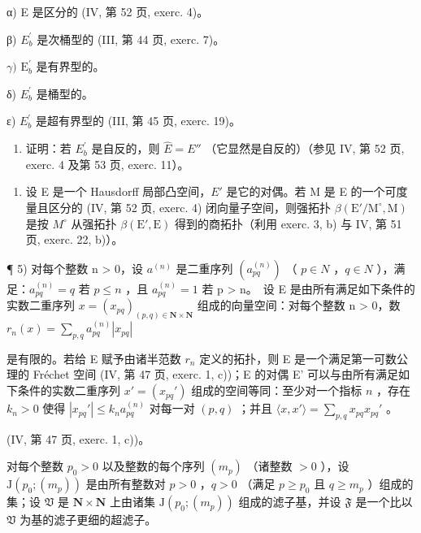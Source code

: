 α) E 是区分的 (IV, 第 52 页, exerc. 4)。

β) \(E_{b}^{\prime}\) 是次桶型的 (III, 第 44 页, exerc. 7)。

\(\gamma)\) \(\mathrm{E}_b^{\prime}\) 是有界型的。

δ) \(E_{b}^{\prime}\) 是桶型的。

ε) \(E_{b}^{\prime}\) 是超有界型的 (III, 第 45 页, exerc. 19)。

\begin{enumerate}
\def\labelenumi{\alph{enumi})}
\setcounter{enumi}{2}
\tightlist
\item
  证明：若 \(E_{b}^{\prime}\) 是自反的，则 \(\hat{E} = E''\) （它显然是自反的）（参见 IV, 第 52 页, exerc. 4 及第 53 页, exerc. 11）。
\end{enumerate}

\begin{enumerate}
\def\labelenumi{\arabic{enumi})}
\setcounter{enumi}{3}
\tightlist
\item
  设 E 是一个 Hausdorff 局部凸空间，\(E'\) 是它的对偶。若 M 是 E 的一个可度量且区分的 (IV, 第 52 页, exerc. 4) 闭向量子空间，则强拓扑 \(\beta(\mathrm{E}'/\mathrm{M}^{\circ}, \mathrm{M})\) 是按 \(M^{\circ}\) 从强拓扑 \(\beta(\mathrm{E}', \mathrm{E})\) 得到的商拓扑（利用 exerc. 3, b) 与 IV, 第 51 页, exerc. 22, b)）。
\end{enumerate}

¶ 5) 对每个整数 n \textgreater{} 0，设 \(a^{(n)}\) 是二重序列 \((a_{pq}^{(n)})\) （ \(p \in N\) ，\(q \in N\) ），满足：\(a_{pq}^{(n)} = q\) 若 \(p \leqslant n\) ，且 \(a_{pq}^{(n)} = 1\) 若 p \textgreater{} n。~设 E 是由所有满足如下条件的实数二重序列 \(x = (x_{pq})_{(p,q) \in \mathbf{N} \times \mathbf{N}}\) 组成的向量空间：对每个整数 n \textgreater{} 0，数 \(r_n(x) = \sum_{p,q} a_{pq}^{(n)} |x_{pq}|\)

是有限的。若给 E 赋予由诸半范数 \(r_n\) 定义的拓扑，则 E 是一个满足第一可数公理的 Fréchet 空间 (IV, 第 47 页, exerc. 1, c))；E 的对偶 E' 可以与由所有满足如下条件的实数二重序列 \(x' = (x_{pq}')\) 组成的空间等同：至少对一个指标 \(n\) ，存在 \(k_n > 0\) 使得 \(|x_{pq}'| \leqslant k_n a_{pq}^{(n)}\) 对每一对 \((p, q)\) ；并且 \(\langle x, x' \rangle = \sum_{p, q} x_{pq} x_{pq}'\) 。

(IV, 第 47 页, exerc. 1, c))。

对每个整数 \(p_0 > 0\) 以及整数的每个序列 \((m_p)\) （诸整数 \(> 0\) ），设 \(\mathrm{J}(p_0; (m_p))\) 是由所有整数对 \(p > 0\) ，\(q > 0\) （满足 \(p \geqslant p_0\) 且 \(q \geqslant m_p\) ）组成的集；设 \(\mathfrak{V}\) 是 \(\mathbf{N} \times \mathbf{N}\) 上由诸集 \(\mathrm{J}(p_0; (m_p))\) 组成的滤子基，并设 \(\mathfrak{F}\) 是一个比以 \(\mathfrak{V}\) 为基的滤子更细的超滤子。

